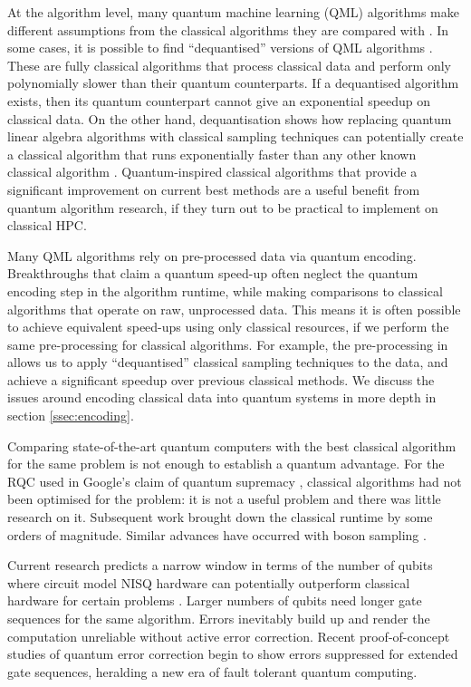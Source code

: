 \documentclass[10pt]{iopart}
\begin{document}
At the algorithm level, many quantum machine learning (QML) algorithms make different assumptions from the classical algorithms they are compared with \cite{Aaronson2015}. In some cases, it is possible to find ``dequantised'' versions of QML algorithms \cite{Tang2022}. These are fully classical algorithms that process classical data and perform only polynomially slower than their quantum counterparts. If a dequantised algorithm exists, then its quantum counterpart cannot give an exponential speedup on classical data.  On the other hand, dequantisation shows how replacing quantum linear algebra algorithms with classical sampling techniques can potentially create a classical algorithm that runs exponentially faster than any other known classical algorithm \cite{Tang2019}. Quantum-inspired classical algorithms that provide a significant improvement on current best methods are a useful benefit from quantum algorithm research, if they turn out to be practical to implement on classical HPC. 
 
Many QML algorithms rely on pre-processed data via quantum encoding. Breakthroughs that claim a quantum speed-up often neglect the quantum encoding step in the algorithm runtime, while making comparisons to classical algorithms that operate on raw, unprocessed data. This means it is often possible to achieve equivalent speed-ups using only classical resources, if we perform the same pre-processing for classical algorithms. For example, the pre-processing in \cite{Tang2019} allows us to apply ``dequantised'' classical sampling techniques to the data, and achieve a significant speedup over previous classical methods.  We discuss the issues around encoding classical data into quantum systems in more depth in section \ref{ssec:encoding}.

Comparing state-of-the-art quantum computers with the best classical algorithm for the same problem is not enough to establish a quantum advantage.  For the RQC used in Google's claim of quantum supremacy \cite{Arute2019}, classical algorithms had not been optimised for the problem: it is not a useful problem and there was little research on it.  Subsequent work brought down the classical runtime by some orders of magnitude.  Similar advances have occurred with boson sampling \cite{Zhong2020,Bulmer2022,Oh2023}.

Current research predicts a narrow window in terms of the number of qubits where circuit model NISQ hardware can potentially outperform classical hardware for certain problems \cite{Bouland2021}.  Larger numbers of qubits need longer gate sequences for the same algorithm. Errors inevitably build up and render the computation unreliable without active error correction. Recent proof-of-concept studies of quantum error correction \cite{RyanAnderson2021,Sivak2023} begin to show errors suppressed for extended gate sequences, heralding a new era of fault tolerant quantum computing.
\end{document}

